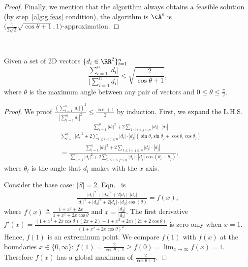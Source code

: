 \begin{proof}
 
 Finally, we mention that the algorithm always obtains a feasible solution (by  step~\ref{alg:g.feas} condition), the algorithm is ${\cA^{\rm e}}$ is\\ $\big(\frac{1}{2\sqrt 2} \sqrt{\cos \theta + 1},1\big)$-approximation.
\end{proof}
\


\begin{lemma}
\label{lem:tb}
Given a set of 2D vectors $\{d_i \in \RR^2\}_{i=1}^n$
$$ \frac{\sum_{i=1}^n |d_i| }{\big| \sum_{i =1}^n d_i \big|} \le \sqrt{\frac{2}{\cos \theta + 1}},$$
where $\theta$ is the maximum angle between any pair of vectors and $0 \le \theta \le \frac{\pi}{2}$.
\end{lemma}
\begin{proof}
We proof $\frac{(\sum_{i=1}^n |d_i| )^2}{|\sum_{i=1}^n d_i |^2} \le \frac{\cos + 1}{2}$  by induction. First, we expand  the L.H.S.
\begin{align}
&\frac{  \sum_{i=1}^n |d_i|^2 +  2\sum_{1\le i < j \le n} |d_i| \cdot |d_j|  } { \sum_{i =1}^n |d_i|^2 +  2\sum_{1\le i < j \le n} |d_i| \cdot |d_j| (\sin \theta_i \sin \theta_j + \cos \theta_i \cos \theta_j)}\nonumber\\
&=\frac{ \sum_{i=1}^n |d_i|^2 +  2\sum_{1\le i < j \le n} |d_i| \cdot |d_j|  } { \sum_{i=1}^n |d_i|^2 +  2\sum_{1\le i < j \le n} |d_i| \cdot |d_j| \cos (\theta_i - \theta_j)}, \label{eq:ind}
\end{align}
where $\theta_i$ is the angle that $d_i$ makes with the $x$ axis.


Consider the base case: $|S|= 2$. Eqn.~ is
\begin{align}
 \frac{|d_1|^2 +|d_2|^2 + 2 |d_1|\cdot |d_2|}{|d_1|^2 +|d_2|^2 + 2 |d_1|\cdot |d_2| \cos(\theta)} = f(x),
\end{align}
where $ f(x) \triangleq \frac{1+x^2+2x}{1+x^2+2x\cos \theta}$ and $x=\frac{|d_2|}{|d_1|}$. The first derivative $f'(x) = \frac{(1+x^2+2x \cos \theta )(2x + 2) - 1+x^2 + 2x)(2x + 2 \cos \theta)}{(1 + x^2 + 2x \cos \theta )^2}$ is zero only when $x=1$. Hence, $f(1)$ is an extreminum point.  We compare $f(1)$ with $f(x)$ at the  boundaries $x\in \{0,\infty\}$: $f(1) = \frac{2}{\cos \theta + 1} \ge f(0) = \lim_{x \to \infty} f(x) = 1$. Therefore $f(x)$ has a global maximum of $\frac{2}{\cos \theta  + 1}$.


\end{proof}
